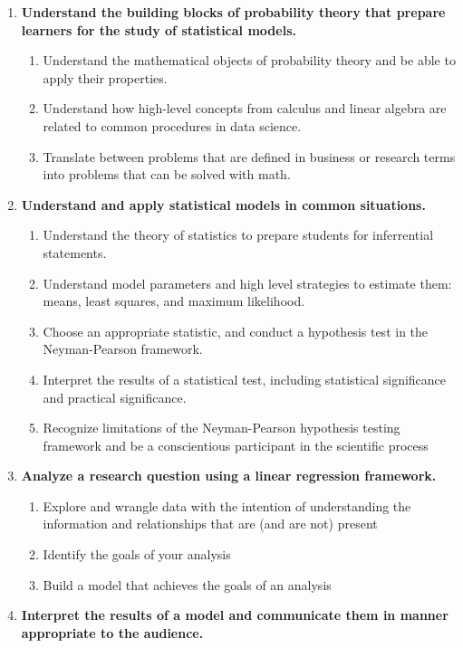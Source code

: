 \documentclass[
]{book}
\providecommand{\tightlist}{%
  \setlength{\itemsep}{0pt}\setlength{\parskip}{0pt}}
\theoremstyle{definition}
\theoremstyle{definition}
\theoremstyle{definition}
\theoremstyle{definition}
\theoremstyle{remark}
\begin{document}
\begin{enumerate}
\def\labelenumi{\arabic{enumi}.}
\tightlist
\item
  \textbf{Understand the building blocks of probability theory that prepare learners for the study of statistical models.}

  \begin{enumerate}
  \def\labelenumii{\arabic{enumii}.}
  \tightlist
  \item
    Understand the mathematical objects of probability theory and be able to apply their properties.
  \item
    Understand how high-level concepts from calculus and linear algebra are related to common procedures in data science.
  \item
    Translate between problems that are defined in business or research terms into problems that can be solved with math.
  \end{enumerate}
\item
  \textbf{Understand and apply statistical models in common situations.}

  \begin{enumerate}
  \def\labelenumii{\arabic{enumii}.}
  \tightlist
  \item
    Understand the theory of statistics to prepare students for inferrential statements.
  \item
    Understand model parameters and high level strategies to estimate them: means, least squares, and maximum likelihood.
  \item
    Choose an appropriate statistic, and conduct a hypothesis test in the Neyman-Pearson framework.
  \item
    Interpret the results of a statistical test, including statistical significance and practical significance.
  \item
    Recognize limitations of the Neyman-Pearson hypothesis testing framework and be a conscientious participant in the scientific process
  \end{enumerate}
\item
  \textbf{Analyze a research question using a linear regression framework.}

  \begin{enumerate}
  \def\labelenumii{\arabic{enumii}.}
  \tightlist
  \item
    Explore and wrangle data with the intention of understanding the information and relationships that are (and are not) present
  \item
    Identify the goals of your analysis
  \item
    Build a model that achieves the goals of an analysis
  \end{enumerate}
\item
  \textbf{Interpret the results of a model and communicate them in manner appropriate to the audience.}


\end{enumerate}
\end{document}
